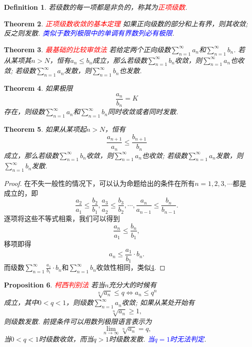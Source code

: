 \documentclass{article}
\newtheorem{theorem}{Theorem}[section]
\newtheorem{proposition}[theorem]{Proposition}
\newtheorem{definition}[theorem]{Definition}
\newcommand{\redt}[1]{\textcolor{red}{#1}}
\newcommand{\bluet}[1]{\textcolor{blue}{#1}}
\begin{document}
\begin{definition}
\rm 若级数的每一项都是非负的，称其为\redt{正项级数}. 
\end{definition}

\begin{theorem}
\rm \redt{正项级数收敛的基本定理} 如果正向级数的部分和上有界，则其收敛; 反之则发散. \bluet{类似于数列极限中的单调有界数列必有极限}.
\end{theorem}


\begin{theorem}
\rm \redt{最基础的比较审敛法}  若给定两个正向级数$\sum\limits_{n=1}^\infty a_n$和$\sum\limits_{n=1}^\infty b_n$. 若从某项其$n > N$，恒有$a_n \leq b_n$成立，那么若级数$\sum\limits_{n=1}^\infty b_n$收敛，则$\sum\limits_{n=1}^\infty a_n$也收敛; 若级数$\sum\limits_{n=1}^\infty a_n$发散，则$\sum\limits_{n=1}^\infty b_n$也发散.
\end{theorem}


\begin{theorem}\label{positive-series: compare-convergence}
\rm 如果极限
$$
\frac{a_n}{b_n} = K
$$
存在，则级数$\sum\limits_{n=1}^\infty a_n$和$\sum\limits_{n=1}^\infty b_n$同时收敛或者同时发散.
\end{theorem}

\begin{theorem}
\rm 如果从某项起$n > N$，恒有
$$
\frac{a_{n+1}}{a_n} \leq \frac{b_{n+1}}{b_n}
$$
成立，那么若级数$\sum\limits_{n=1}^\infty b_n$收敛，则$\sum\limits_{n=1}^\infty a_n$也收敛; 若级数$\sum\limits_{n=1}^\infty a_n$发散，则$\sum\limits_{n=1}^\infty b_n$发散. 
\end{theorem}

\begin{proof}
在不失一般性的情况下，可以认为命题给出的条件在所有$n=1,2,3,\cdots$都是成立的，即
$$
\frac{a_2}{a_1} \leq \frac{b_2}{b_1},\frac{a_3}{a_2} \leq \frac{b_3}{b_2}, \cdots, \frac{a_{n}}{a_{n-1}} \leq \frac{b_{n}}{b_{n-1}}.
$$
逐项将这些不等式相乘，我们可以得到
$$
\frac{a_{n}}{a_1} \leq \frac{b_{n}}{b_1},
$$
移项即得
$$
a_n \leq \frac{a_1}{b_1}\cdot b_n. 
$$
而级数$\sum\limits_{n=1}^\infty \frac{a_1}{b_1}\cdot b_n$和$\sum\limits_{n=1}^\infty b_n$收敛性相同，类似\ref{positive-series: compare-convergence}.
\end{proof}

\begin{proposition}
\rm \redt{柯西判别法} 若当$n$充分大的时候有
$$
\sqrt[n]{a_n} \leq q \Leftrightarrow a_n \leq q^n
$$
成立，其中$0 < q <1$，则级数$\sum\limits_{n=1}^\infty a_n$收敛; 如果从某处开始有
$$
\sqrt[n]{a_n} \geq 1,
$$
则级数发散. 前提条件可以用数列极限语言表示为
$$
\lim\limits_{n \to \infty} \sqrt[n]{a_n} = q,
$$
当$0 < q <1$时级数收敛，而当$q >1$时级数发散. \bluet{当$q=1$时无法判定}. 
\end{proposition}
\end{document}
